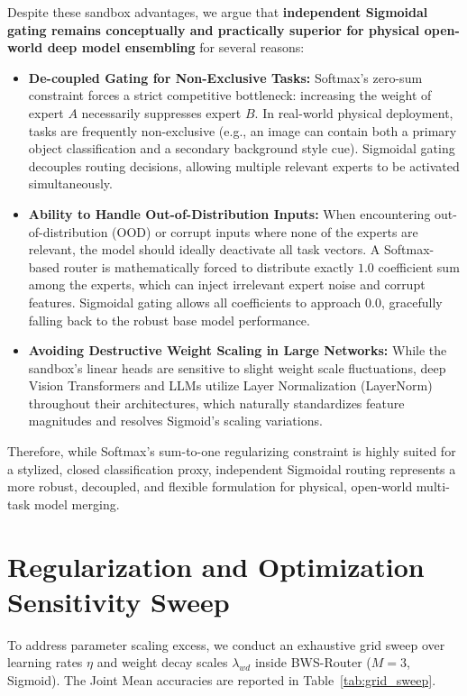 Despite these sandbox advantages, we argue that \textbf{independent Sigmoidal gating remains conceptually and practically superior for physical open-world deep model ensembling} for several reasons:
\begin{itemize}
    \item \textbf{De-coupled Gating for Non-Exclusive Tasks:} Softmax's zero-sum constraint forces a strict competitive bottleneck: increasing the weight of expert $A$ necessarily suppresses expert $B$. In real-world physical deployment, tasks are frequently non-exclusive (e.g., an image can contain both a primary object classification and a secondary background style cue). Sigmoidal gating decouples routing decisions, allowing multiple relevant experts to be activated simultaneously.
    \item \textbf{Ability to Handle Out-of-Distribution Inputs:} When encountering out-of-distribution (OOD) or corrupt inputs where none of the experts are relevant, the model should ideally deactivate all task vectors. A Softmax-based router is mathematically forced to distribute exactly $1.0$ coefficient sum among the experts, which can inject irrelevant expert noise and corrupt features. Sigmoidal gating allows all coefficients to approach $0.0$, gracefully falling back to the robust base model performance.
    \item \textbf{Avoiding Destructive Weight Scaling in Large Networks:} While the sandbox's linear heads are sensitive to slight weight scale fluctuations, deep Vision Transformers and LLMs utilize Layer Normalization (LayerNorm) throughout their architectures, which naturally standardizes feature magnitudes and resolves Sigmoid's scaling variations. 
\end{itemize}
Therefore, while Softmax's sum-to-one regularizing constraint is highly suited for a stylized, closed classification proxy, independent Sigmoidal routing represents a more robust, decoupled, and flexible formulation for physical, open-world multi-task model merging.


\section{Regularization and Optimization Sensitivity Sweep}
\label{app:regularization_sweep}
To address parameter scaling excess, we conduct an exhaustive grid sweep over learning rates $\eta$ and weight decay scales $\lambda_{wd}$ inside BWS-Router ($M=3$, Sigmoid). The Joint Mean accuracies are reported in Table~\ref{tab:grid_sweep}.

